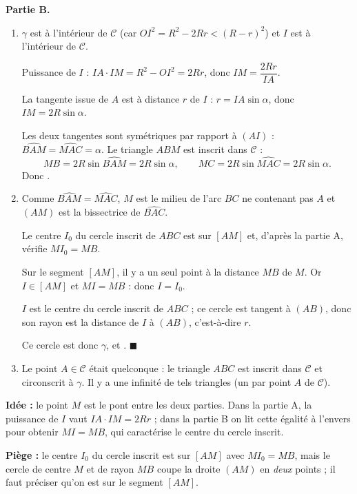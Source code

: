 \textbf{Partie B.}
\begin{enumerate}[itemsep=14pt]
  \item $\gamma$ est à l'intérieur de $\mathcal C$ (car $OI^2=R^2-2Rr<(R-r)^2$) et $I$ est à l'intérieur de $\mathcal C$.

  Puissance de $I$ : $IA\cdot IM=R^2-OI^2=2Rr$, donc $IM=\dfrac{2Rr}{IA}$.

  La tangente issue de $A$ est à distance $r$ de $I$ : $r=IA\sin\alpha$, donc $IM=2R\sin\alpha$.

  Les deux tangentes sont symétriques par rapport à $(AI)$ : $\widehat{BAM}=\widehat{MAC}=\alpha$. Le triangle $ABM$ est inscrit dans $\mathcal C$ :
  \[MB=2R\sin\widehat{BAM}=2R\sin\alpha,\qquad MC=2R\sin\widehat{MAC}=2R\sin\alpha.\]
  Donc .

  \item Comme $\widehat{BAM}=\widehat{MAC}$, $M$ est le milieu de l'arc $BC$ ne contenant pas $A$ et $(AM)$ est la bissectrice de $\widehat{BAC}$.

  Le centre $I_0$ du cercle inscrit de $ABC$ est sur $[AM]$ et, d'après la partie A, vérifie $MI_0=MB$.

  Sur le segment $[AM]$, il y a un seul point à la distance $MB$ de $M$. Or $I\in[AM]$ et $MI=MB$ : donc $I=I_0$.

  $I$ est le centre du cercle inscrit de $ABC$ ; ce cercle est tangent à $(AB)$, donc son rayon est la distance de $I$ à $(AB)$, c'est-à-dire $r$.

  Ce cercle est donc $\gamma$, et . $\blacksquare$

  \item Le point $A\in\mathcal C$ était quelconque : le triangle $ABC$ est inscrit dans $\mathcal C$ et circonscrit à $\gamma$. Il y a une infinité de tels triangles (un par point $A$ de $\mathcal C$).
\end{enumerate}

\textbf{Idée :} le point $M$ est le pont entre les deux parties. Dans la partie A, la puissance de $I$ vaut $IA\cdot IM=2Rr$ ; dans la partie B on lit cette égalité à l'envers pour obtenir $MI=MB$, qui caractérise le centre du cercle inscrit.

\textbf{Piège :} le centre $I_0$ du cercle inscrit est sur $[AM]$ avec $MI_0=MB$, mais le cercle de centre $M$ et de rayon $MB$ coupe la droite $(AM)$ en \emph{deux} points ; il faut préciser qu'on est sur le segment $[AM]$.
